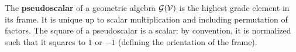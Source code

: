 \begin{definition}
	The \textbf{pseudoscalar} of a geometric algebra $\mathcal{G}(\mathcal{V})$ is the highest grade element in its frame. It is unique up to scalar multiplication and including permutation of factors.
	The square of a pseudoscalar is a scalar: by convention, it is normalized such that it squares to $1$ or $-1$ (defining the orientation of the frame).
\end{definition}
